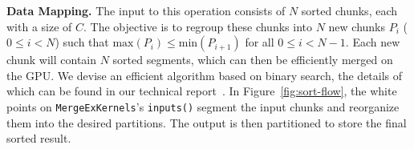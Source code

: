 \noindent
\textbf{Data Mapping.}
The input to this operation consists of \( N \) sorted chunks, each with a size of \( C \). 
The objective is to regroup these chunks into \( N \) new chunks \( P_i \) (\( 0 \leq i < N \)) such that \(\text{max}(P_i) \leq \text{min}(P_{i + 1})\) for all \(0 \leq i < N - 1\). 
Each new chunk will contain \( N \) sorted segments, which can then be efficiently merged on the GPU.
We devise an efficient algorithm based on binary search, the details of which can be found in our technical report~\cite{vortex-technical-report}.
In Figure~\ref{fig:sort-flow}, the white points on \texttt{MergeExKernels}'s \texttt{inputs()} segment the input chunks and reorganize them into the desired partitions.
The output is then partitioned to store the final sorted result.



